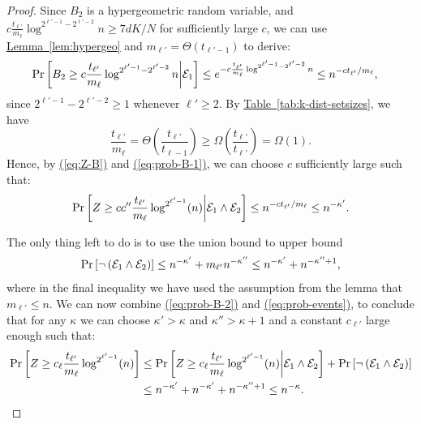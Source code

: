 \documentclass{article}
\newcommand{\eq}[1]{\hyperref[eq:#1]{(\ref*{eq:#1})}}
\newcommand{\lem}[1]{\hyperref[lem:#1]{Lemma~\ref*{lem:#1}}}
\newcommand{\tabl}[1]{\hyperref[tab:#1]{Table~\ref*{tab:#1}}}
\renewcommand{\>}{\rangle}
\newcommand{\<}{\langle}
\renewcommand{\(}{\left(}
\renewcommand{\)}{\right)}
\begin{document}
\begin{proof}
Since $B_2$ is a hypergeometric random variable, and $c\frac{t_{\ell'}}{m_{\ell}}\log^{2^{\ell'-1}-2^{\ell'-2}} n \geq 7dK/N$ for sufficiently large $c$,
we can use \lem{hypergeo} and $m_{\ell'} = \Theta\left(t_{\ell'-1}\right)$ to derive:
\begin{equation}\label{eq:prob-B-1}
\begin{aligned}
	\Pr\left[B_2 \geq c\frac{t_{\ell'}}{m_{\ell}}\log^{2^{\ell'-1}-2^{\ell'-2}} n\middle| {\cal E}_1\right] &\leq 
 e^{-c\frac{t_{\ell'}}{m_{\ell}}\log^{2^{\ell'-1}-2^{\ell'-2}} n} 
\leq n^{-c t_{\ell'}/m_{\ell}},
\end{aligned}
\end{equation}
since $2^{\ell'-1}-2^{\ell'-2}\geq 1$ whenever $\ell'\geq 2$. By \tabl{k-dist-setsizes}, we have
$$\frac{t_{\ell'}}{m_{\ell}} = \Theta\left(\frac{t_{\ell'}}{t_{\ell-1}}\right) \geq \Omega \left(\frac{t_{\ell'}}{t_{\ell'}}\right)= \Omega(1).$$
Hence, by \eq{Z-B} and \eq{prob-B-1}, we can choose $c$ sufficiently large such that:
\begin{equation}\label{eq:prob-B-2}
	\Pr\left[Z \geq cc''\frac{t_{\ell'}}{m_{\ell}}\log^{2^{\ell'-1}} (n)\middle| {\cal E}_1 \wedge {\cal E}_2\right] \leq n^{-ct_{\ell'}/m_{\ell}} \leq n^{-\kappa'}.
\end{equation}

\noindent The only thing left to do is to use the union bound to upper bound
\begin{equation}\label{eq:prob-events}
	\Pr\left[\neg \left({\cal E}_1 \wedge {\cal E}_2\right) \right] \leq  n^{-\kappa'} +  m_{\ell'}n^{-\kappa''} \leq n^{-\kappa'} + n^{-\kappa''+1}, 
\end{equation}
where in the final inequality we have used the assumption from the lemma that $m_{\ell'}\leq n$.
We can now combine \eq{prob-B-2} and \eq{prob-events}, to conclude that for any $\kappa$ we can choose $\kappa'>\kappa$ and $\kappa'' > \kappa+1$ and a constant $c_{\ell'}$ large enough such that:
\begin{align*}
	\Pr\left[Z \geq c_{\ell}\frac{t_{\ell'}}{m_{\ell}}\log^{2^{\ell'-1}} (n)\right] &\leq \Pr\left[Z \geq c_{\ell}\frac{t_{\ell'}}{m_{\ell}}\log^{2^{\ell'-1}} (n)\middle| {\cal E}_1 \wedge {\cal E}_2 \right] + \Pr\left[\neg \left({\cal E}_1 \wedge {\cal E}_2\right) \right] \\
	&\leq n^{-\kappa'} +  n^{-\kappa'} + n^{-\kappa''+1} \leq n^{-\kappa}.\qedhere
\end{align*}
\end{proof}
\end{document}
